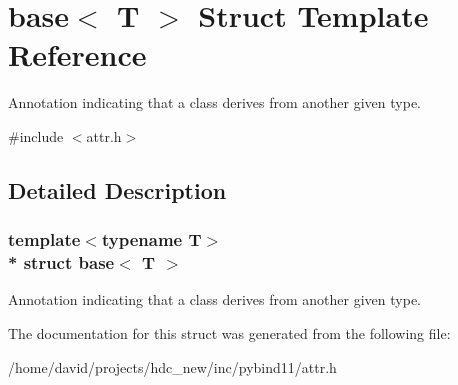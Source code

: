 \hypertarget{structbase}{}\section{base$<$ T $>$ Struct Template Reference}
\label{structbase}


Annotation indicating that a class derives from another given type.  




{\ttfamily \#include $<$attr.\+h$>$}



\subsection{Detailed Description}
\subsubsection*{template$<$typename T$>$\\*
struct base$<$ T $>$}

Annotation indicating that a class derives from another given type. 

The documentation for this struct was generated from the following file\+:\begin{DoxyCompactItemize}
\item 
/home/david/projects/hdc\+\_\+new/inc/pybind11/attr.\+h\end{DoxyCompactItemize}
